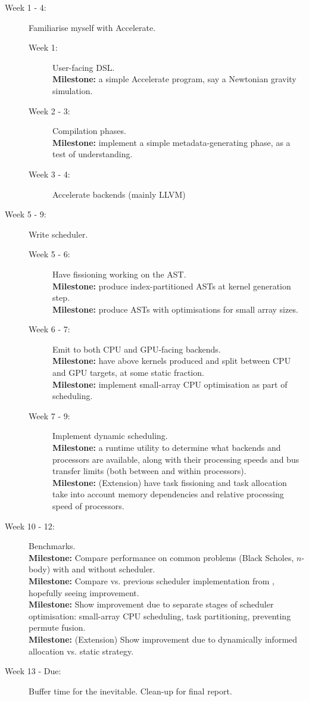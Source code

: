 \documentclass[a4paper,12pt]{article}
\newcommand{\milestone}[0]{\textbf{Milestone:} }
\begin{document}
\begin{description}
  \item[Week 1 - 4:] 
    Familiarise myself with Accelerate.
    \begin{description}
      \item[Week 1:] 
        User-facing DSL. 
        \\\milestone a simple Accelerate program, say a Newtonian gravity simulation.
      \item[Week 2 - 3:] 
        Compilation phases. 
        \\\milestone implement a simple metadata-generating phase, as a test of understanding.
      \item[Week 3 - 4:] 
        Accelerate backends (mainly LLVM)
    \end{description}
  \item[Week 5 - 9:] 
    Write scheduler.
    \begin{description}
      \item[Week 5 - 6:] 
        Have fissioning working on the AST. 
        \\\milestone produce index-partitioned ASTs at kernel generation step.
        \\\milestone produce ASTs with optimisations for small array sizes.
      \item[Week 6 - 7:]
        Emit to both CPU and GPU-facing backends. 
        \\\milestone have above kernels produced and split between CPU and GPU targets, at some static fraction.
        \\\milestone implement small-array CPU optimisation as part of scheduling.
      \item[Week 7 - 9:]
        Implement dynamic scheduling.
        \\\milestone a runtime utility to determine what backends and processors are available, along with their processing speeds and bus transfer limits (both between and within processors).
        \\\milestone (Extension) have task fissioning and task allocation take into account memory dependencies and relative processing speed of processors.
    \end{description}
  \item[Week 10 - 12:]
    Benchmarks.
    \\\milestone Compare performance on common problems (Black Scholes, $n$-body) with and without scheduler.
    \\\milestone Compare vs. previous scheduler implementation from \citet{newton_converting_2014}, hopefully seeing improvement.
    \\\milestone Show improvement due to separate stages of scheduler optimisation: small-array CPU scheduling, task partitioning, preventing permute fusion.
    \\\milestone (Extension) Show improvement due to dynamically informed allocation vs. static strategy.
  \item[Week 13 - Due:] Buffer time for the inevitable. Clean-up for final report.
\end{description}
\end{document}
